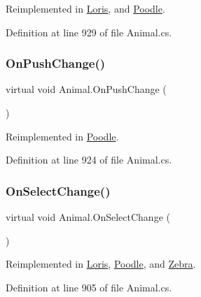 Reimplemented in \mbox{\hyperlink{class_loris_a2a3cedda95b895253c1ae39844680351}{Loris}}, and \mbox{\hyperlink{class_poodle_a43c5147cedef40592b077814bffda480}{Poodle}}.



Definition at line 929 of file Animal.\+cs.

\mbox{\label{class_animal_a001734bbca74a2240ab30be09746ecd1}} 
\subsubsection{\texorpdfstring{On\+Push\+Change()}{OnPushChange()}}
{\footnotesize\ttfamily virtual void Animal.\+On\+Push\+Change (\begin{DoxyParamCaption}{ }\end{DoxyParamCaption})\hspace{0.3cm}{\ttfamily [virtual]}}



Reimplemented in \mbox{\hyperlink{class_poodle_a5c281a37883590cab7ffd1bd361e4eac}{Poodle}}.



Definition at line 924 of file Animal.\+cs.

\mbox{\label{class_animal_a10f83b51d56e077b400cf6b81b8f9aed}} 
\subsubsection{\texorpdfstring{On\+Select\+Change()}{OnSelectChange()}}
{\footnotesize\ttfamily virtual void Animal.\+On\+Select\+Change (\begin{DoxyParamCaption}{ }\end{DoxyParamCaption})\hspace{0.3cm}{\ttfamily [virtual]}}



Reimplemented in \mbox{\hyperlink{class_loris_a9da05849af0ab3b5ff8ac6e47f83a8f9}{Loris}}, \mbox{\hyperlink{class_poodle_a57d0ab14cdd7ac693e010ca42fe52a6e}{Poodle}}, and \mbox{\hyperlink{class_zebra_a3043e9cd3444f7c439e44f8eefbc55e0}{Zebra}}.



Definition at line 905 of file Animal.\+cs.

